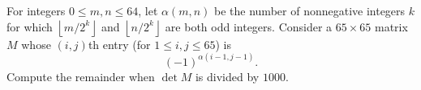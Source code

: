 For integers $0 \le m,n \le 64$, let $\alpha(m,n)$ be the number of nonnegative integers $k$ for which $\left\lfloor m/2^k \right\rfloor$ and $\left\lfloor n/2^k \right\rfloor$ are both odd integers.  Consider a $65 \times 65$ matrix $M$ whose $(i,j)$th entry (for $1 \le i, j \le 65$) is \[ (-1)^{\alpha(i-1, j-1)}. \] Compute the remainder when $\det M$ is divided by $1000$.
